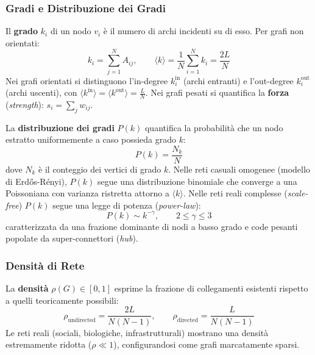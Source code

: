 \subsubsection{Gradi e Distribuzione dei Gradi}
Il \textbf{grado} $k_i$ di un nodo $v_i$ è il numero di archi incidenti su di esso. Per grafi non orientati:
\begin{equation}
    k_i = \sum_{j=1}^N A_{ij}, \qquad \langle k \rangle = \frac{1}{N} \sum_{i=1}^N k_i = \frac{2L}{N}
\end{equation}
Nei grafi orientati si distinguono l'in-degree $k_i^{\text{in}}$ (archi entranti) e l'out-degree $k_i^{\text{out}}$ (archi uscenti), con $\langle k^{\text{in}} \rangle = \langle k^{\text{out}} \rangle = \frac{L}{N}$. Nei grafi pesati si quantifica la \textbf{forza} (\textit{strength}): $s_i = \sum_{j} w_{ij}$.

La \textbf{distribuzione dei gradi} $P(k)$ quantifica la probabilità che un nodo estratto uniformemente a caso possieda grado $k$:
\begin{equation}
    P(k) = \frac{N_k}{N}
\end{equation}
dove $N_k$ è il conteggio dei vertici di grado $k$. Nelle reti casuali omogenee (modello di Erd\H{o}s-R{\'e}nyi), $P(k)$ segue una distribuzione binomiale che converge a una Poissoniana con varianza ristretta attorno a $\langle k \rangle$. Nelle reti reali complesse (\textit{scale-free}) $P(k)$ segue una legge di potenza (\textit{power-law}):
\begin{equation}
    P(k) \sim k^{-\gamma}, \qquad 2 \le \gamma \le 3
\end{equation}
caratterizzata da una frazione dominante di nodi a basso grado e code pesanti popolate da super-connettori (\textit{hub}).

\subsubsection{Densità di Rete}
La \textbf{densità} $\rho(G) \in [0, 1]$ esprime la frazione di collegamenti esistenti rispetto a quelli teoricamente possibili:
\begin{equation}
    \rho_{\text{undirected}} = \frac{2L}{N(N-1)}, \qquad \rho_{\text{directed}} = \frac{L}{N(N-1)}
\end{equation}
Le reti reali (sociali, biologiche, infrastrutturali) mostrano una densità estremamente ridotta ($\rho \ll 1$), configurandosi come grafi marcatamente sparsi.

